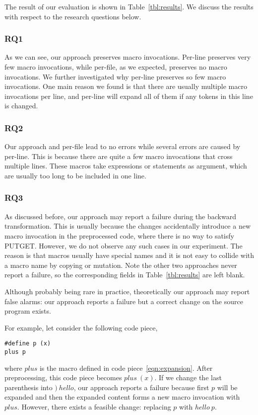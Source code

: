 The result of our evaluation is shown in Table~\ref{tbl:results}. We
discuss the results with respect to the research questions below.

\subsubsection{RQ1} As we can see, our approach preserves macro invocations. Per-line preserves very few macro
invocations, while per-file, as we expected, preserves no macro
invocations. We further investigated why per-line preserves so few
macro invocations. One main reason we found is that there are usually
multiple macro invocations per line, and per-line will expand all of
them if any tokens in this line is changed.
\subsubsection{RQ2} Our approach and per-file lead to no errors while
several errors are caused by per-line. This is because there are quite
a few macro invocations that cross multiple lines. These macros 
take expressions or statements as argument, which are usually too long
to be included in one line.
\subsubsection{RQ3} As discussed before, our approach may report a failure during the
backward transformation. This is usually because the changes
accidentally introduce a new macro invocation in the preprocessed code, where there is no way
to satisfy PUTGET. 
However, we do not
observe any such cases in our experiment. The reason is that
macros usually have special names and it is not easy to collide with a
macro name by copying or mutation. Note the other two
approaches never report a failure, so the corresponding fields in Table~\ref{tbl:results} are left blank. 

Although probably being rare in practice, theoretically our approach
may report false alarms: our approach reports a failure but
a correct change on the source program exists. {For example, let consider the
  following code piece,
\begin{lstlisting}
#define p (x)
plus p
\end{lstlisting}
where $plus$ is the macro defined in code
piece~\eqref{eqn:expansion}. After preprocessing, this code piece becomes
$plus\ (x)$. If we change the last parenthesis into $)\ hello$, our
approach reports a failure because first $p$ will be expanded and then
the expanded content forms a new macro invocation with $plus$.
However, there exists a feasible change: replacing $p$ with $hello\ p$.}

